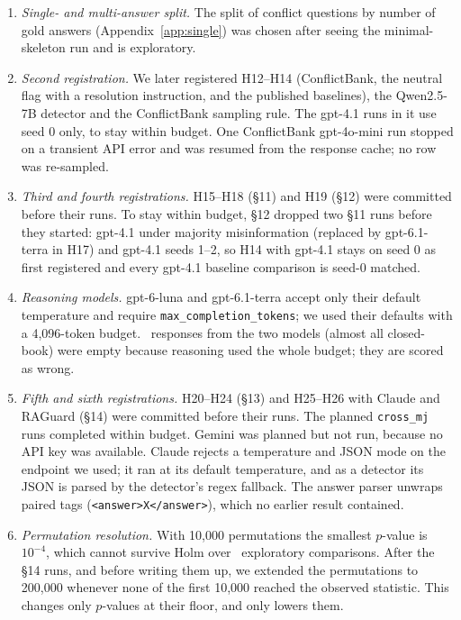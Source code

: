 \begin{enumerate}[leftmargin=*,itemsep=1pt,topsep=2pt]
throughout (Section~\ref{sec:setup}), which makes some exploratory differences that were bold in earlier drafts
non-significant.
\item \emph{Single- and multi-answer split.} The split of conflict questions by number of gold answers
(Appendix~\ref{app:single}) was chosen after seeing the minimal-skeleton run and is exploratory.
\item \emph{Second registration.} We later registered H12--H14 (ConflictBank, the neutral flag with a
resolution instruction, and the published baselines), the Qwen2.5-7B detector and the ConflictBank sampling rule.
The gpt-4.1 runs in it use seed 0 only, to stay within budget. One ConflictBank gpt-4o-mini run stopped on a
transient API error and was resumed from the response cache; no row was re-sampled.
\item \emph{Third and fourth registrations.} H15--H18 (\S11) and H19 (\S12) were committed before their runs. To stay
within budget, \S12 dropped two \S11 runs before they started: gpt-4.1 under majority misinformation (replaced by
gpt-6.1-terra in H17) and gpt-4.1 seeds 1--2, so H14 with gpt-4.1 stays on seed 0 as first registered and every
gpt-4.1 baseline comparison is seed-0 matched.
\item \emph{Reasoning models.} gpt-6-luna and gpt-6.1-terra accept only their default temperature and require
\texttt{max\_completion\_tokens}; we used their defaults with a 4,096-token budget. \Nempty\ responses from the
two models (almost all closed-book) were empty because reasoning used the whole budget; they are scored as wrong.
\item \emph{Fifth and sixth registrations.} H20--H24 (\S13) and H25--H26 with Claude and RAGuard (\S14) were
committed before their runs. The planned \texttt{cross\_mj} runs completed within budget. Gemini was planned
but not run, because no API key was available. Claude rejects a temperature and JSON mode on the endpoint we used; it
ran at its default temperature, and as a detector its JSON is parsed by the detector's regex fallback. The answer
parser unwraps paired tags (\texttt{<answer>X</answer>}), which no earlier result contained.
\item \emph{Permutation resolution.} With 10,000 permutations the smallest $p$-value is $10^{-4}$, which cannot
survive Holm over \nExploratory\ exploratory comparisons. After the \S14 runs, and before writing them up, we
extended the permutations to 200,000 whenever none of the first 10,000 reached the observed statistic. This changes
only $p$-values at their floor, and only lowers them.

\end{enumerate}
